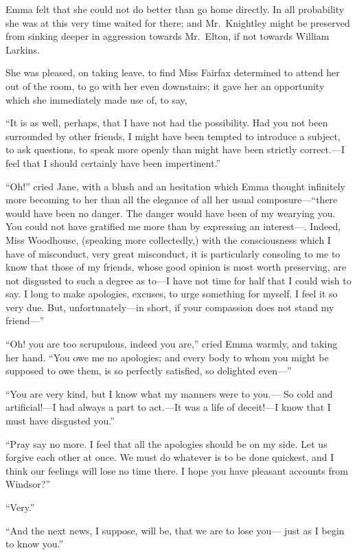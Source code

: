 Emma felt that she could not do better than go home directly.
In all probability she was at this very time waited for there;
and Mr.\ Knightley might be preserved from sinking deeper in aggression
towards Mr.\ Elton, if not towards William Larkins.

She was pleased, on taking leave, to find Miss Fairfax determined
to attend her out of the room, to go with her even downstairs;
it gave her an opportunity which she immediately made use of,
to say,

``It is as well, perhaps, that I have not had the possibility.
Had you not been surrounded by other friends, I might have been
tempted to introduce a subject, to ask questions, to speak more
openly than might have been strictly correct.---I feel that I should
certainly have been impertinent.''

``Oh!'' cried Jane, with a blush and an hesitation which Emma thought
infinitely more becoming to her than all the elegance of all her
usual composure---``there would have been no danger.  The danger
would have been of my wearying you.  You could not have gratified
me more than by expressing an interest---.  Indeed, Miss Woodhouse,
(speaking more collectedly,) with the consciousness which I
have of misconduct, very great misconduct, it is particularly
consoling to me to know that those of my friends, whose good
opinion is most worth preserving, are not disgusted to such a
degree as to---I have not time for half that I could wish to say.
I long to make apologies, excuses, to urge something for myself.
I feel it so very due.  But, unfortunately---in short, if your
compassion does not stand my friend---''

``Oh! you are too scrupulous, indeed you are,'' cried Emma warmly,
and taking her hand.  ``You owe me no apologies; and every body to
whom you might be supposed to owe them, is so perfectly satisfied,
so delighted even---''

``You are very kind, but I know what my manners were to you.---%
So cold and artificial!---I had always a part to act.---It was a life
of deceit!---I know that I must have disgusted you.''

``Pray say no more.  I feel that all the apologies should be on my side.
Let us forgive each other at once.  We must do whatever is to be
done quickest, and I think our feelings will lose no time there.
I hope you have pleasant accounts from Windsor?''

``Very.''

``And the next news, I suppose, will be, that we are to lose you---%
just as I begin to know you.''

